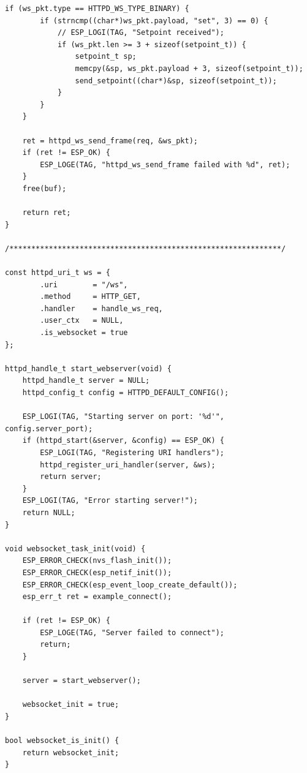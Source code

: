 \begin{lstlisting}[caption={websocket.c}]
    if (ws_pkt.type == HTTPD_WS_TYPE_BINARY) {
        if (strncmp((char*)ws_pkt.payload, "set", 3) == 0) {
            // ESP_LOGI(TAG, "Setpoint received");
            if (ws_pkt.len >= 3 + sizeof(setpoint_t)) {
                setpoint_t sp;
                memcpy(&sp, ws_pkt.payload + 3, sizeof(setpoint_t));
                send_setpoint((char*)&sp, sizeof(setpoint_t));
            } 
        }
    }
    
    ret = httpd_ws_send_frame(req, &ws_pkt);
    if (ret != ESP_OK) {
        ESP_LOGE(TAG, "httpd_ws_send_frame failed with %d", ret);
    }
    free(buf);

    return ret;
}

/**************************************************************/

const httpd_uri_t ws = {
        .uri        = "/ws",
        .method     = HTTP_GET,
        .handler    = handle_ws_req,
        .user_ctx   = NULL,
        .is_websocket = true
};

httpd_handle_t start_webserver(void) {
    httpd_handle_t server = NULL;
    httpd_config_t config = HTTPD_DEFAULT_CONFIG();
    
    ESP_LOGI(TAG, "Starting server on port: '%d'", config.server_port);
    if (httpd_start(&server, &config) == ESP_OK) {
        ESP_LOGI(TAG, "Registering URI handlers");
        httpd_register_uri_handler(server, &ws);
        return server;
    }
    ESP_LOGI(TAG, "Error starting server!");
    return NULL;
}

void websocket_task_init(void) {
    ESP_ERROR_CHECK(nvs_flash_init());
    ESP_ERROR_CHECK(esp_netif_init());
    ESP_ERROR_CHECK(esp_event_loop_create_default());
    esp_err_t ret = example_connect();

    if (ret != ESP_OK) {
        ESP_LOGE(TAG, "Server failed to connect");
        return; 
    }

    server = start_webserver();

    websocket_init = true;
}

bool websocket_is_init() {
    return websocket_init;
}
\end{lstlisting}
